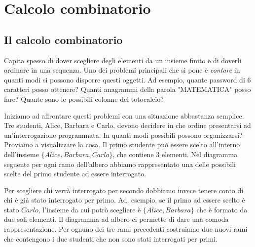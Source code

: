 
\chapter{Calcolo combinatorio}

\section{Il calcolo combinatorio}
\label{sec:01_introduzione}
Capita spesso di dover scegliere degli elementi da un insieme finito e di doverli ordinare in una sequenza. Uno dei problemi principali che si pone è \emph{contare} in quanti modi si possono disporre questi oggetti. Ad esempio, quante password di 6 caratteri posso ottenere? Quanti anagrammi della parola "MATEMATICA" posso fare? Quante sono le possibili colonne del totocalcio?

Iniziamo ad affrontare questi problemi con una situazione abbastanza semplice. Tre studenti, Alice, Barbara e Carlo, devono decidere in che ordine presentarsi ad un'interrogazione programmata.
In quanti modi possibili possono organizzarsi?
Proviamo a visualizzare la cosa. Il primo studente può essere scelto all'interno dell'insieme $\{Alice,Barbara,Carlo\}$, che contiene 3 elementi. Nel diagramma seguente per ogni ramo dell'albero abbiamo rappresentato una delle possibili scelte del primo studente ad essere interrogato.

\begin{center}
\end{center}

Per scegliere chi verrà interrogato per secondo dobbiamo invece tenere conto di chi è già stato interrogato per primo. Ad, esempio, se il primo ad essere scelto è stato $Carlo$, l'insieme da cui potrò scegliere è $\{Alice, Barbara\}$ che è formato da due soli elementi. Il diagramma ad albero ci permette di dare una comoda rappresentazione. Per ognuno dei tre rami precedenti costruiamo due nuovi rami che contengono i due studenti che non sono stati interrogati per primi.

